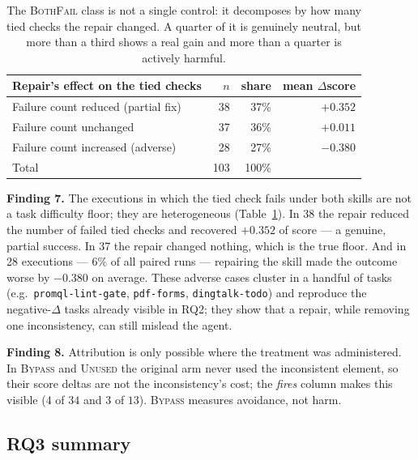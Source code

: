 \begin{table}[t]
\centering\small
\caption{The \textsc{BothFail} class is not a single control: it decomposes by how many tied checks
the repair changed. A quarter of it is genuinely neutral, but more than a third shows a real gain and
more than a quarter is actively harmful.}
\label{tab:bothfail}
\begin{tabular}{@{}lrrr@{}}
\toprule
Repair's effect on the tied checks & $n$ & share & mean $\Delta$score \\
\midrule
Failure count reduced (partial fix)  & 38 & 37\% & $+0.352$ \\
Failure count unchanged              & 37 & 36\% & $+0.011$ \\
Failure count increased (adverse)    & 28 & 27\% & $-0.380$ \\
\midrule
Total                                & 103 & 100\% & \\
\bottomrule
\end{tabular}
\end{table}

\textbf{Finding 7.} The executions in which the tied check fails under both skills are not a task
difficulty floor; they are heterogeneous (Table~\ref{tab:bothfail}). In 38 the repair reduced the
number of failed tied checks and recovered $+0.352$ of score --- a genuine, partial success. In 37 the
repair changed nothing, which is the true floor. And in 28 executions --- 6\% of all paired runs ---
repairing the skill made the outcome worse by $-0.380$ on average. These adverse cases cluster in a
handful of tasks (e.g.\ \texttt{promql-lint-gate}, \texttt{pdf-forms}, \texttt{dingtalk-todo}) and
reproduce the negative-$\Delta$ tasks already visible in RQ2; they show that a repair, while removing
one inconsistency, can still mislead the agent.

\textbf{Finding 8.} Attribution is only possible where the treatment was administered. In
\textsc{Bypass} and \textsc{Unused} the original arm never used the inconsistent element, so their
score deltas are not the inconsistency's cost; the \emph{fires} column makes this visible ($4$ of $34$
and $3$ of $13$). \textsc{Bypass} measures avoidance, not harm.

\subsection{RQ3 summary}
\label{sec:rq3-summary}

